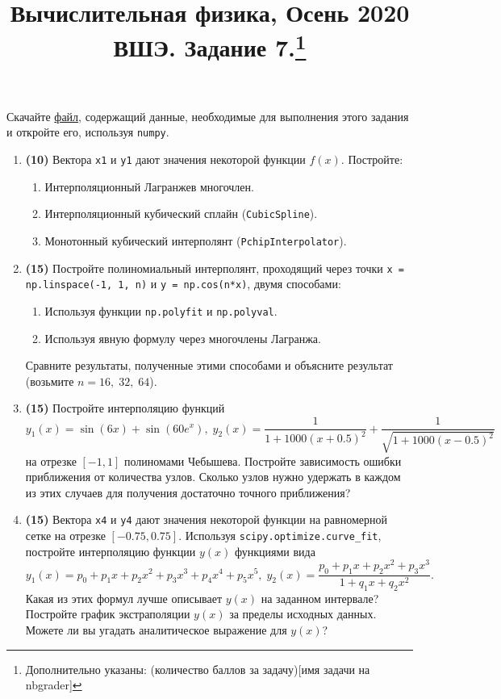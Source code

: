 \documentclass[prb,papersize=a4paper,notitlepage]{revtex4-1}%
\begin{document}
\title{Вычислительная физика, Осень 2020 ВШЭ. Задание 7.\footnote{Дополнительно указаны: (количество баллов за задачу)[имя задачи на nbgrader]}}
\maketitle
Скачайте \href{https://www.dropbox.com/s/txs1nmehh7aw71w/data.npz?dl=0}{файл}, содержащий данные, необходимые для выполнения этого задания и откройте его, используя \lstinline{numpy}.

\begin{enumerate}
\item \textbf{(10)} Вектора \lstinline{x1} и \lstinline{y1} дают значения некоторой функции $f(x)$. 
Постройте:
\begin{enumerate}
\item Интерполяционный Лагранжев многочлен.
\item Интерполяционный кубический сплайн (\lstinline{CubicSpline}).
\item Монотонный кубический интерполянт (\lstinline{PchipInterpolator}).
\end{enumerate}


\item \textbf{(15)}
Постройте полиномиальный интерполянт, проходящий через точки \lstinline{x = np.linspace(-1, 1, n)} и \lstinline{y = np.cos(n*x)}, двумя способами:
\begin{enumerate}
\item Используя функции \lstinline{np.polyfit} и \lstinline{np.polyval}.
\item Используя явную формулу через многочлены Лагранжа.
\end{enumerate}
Сравните результаты, полученные этими способами и объясните результат (возьмите $n=16,\;32,\;64$).


\item \textbf{(15)}
Постройте интерполяцию функций
$$
y_1(x)=\sin(6x) + \sin(60 e^x),\; y_2(x)=\frac{1}{1+1000(x+0.5)^2}+\frac{1}{\sqrt{1+1000(x-0.5)^2}}
$$
на отрезке $[-1,1]$ полиномами Чебышева. Постройте зависимость ошибки приближения от количества узлов. Сколько узлов нужно удержать в каждом из этих случаев для получения достаточно точного приближения? 

\item \textbf{(15)} Вектора \lstinline{x4} и \lstinline{y4} дают значения некоторой функции на равномерной сетке на отрезке $[-0.75, 0.75]$. Используя \lstinline{scipy.optimize.curve_fit}, постройте интерполяцию функции $y(x)$ функциями вида
$$
y_1(x)=p_0+p_1 x+p_2 x^2+p_3 x^3+p_4 x^4 + p_5 x^5,\; y_2(x)=\frac{p_0+p_1 x+p_2 x^2+p_3 x^3}{1+q_1 x+q_2 x^2}.
$$
Какая из этих формул лучше описывает $y(x)$ на заданном интервале? Постройте график экстраполяции $y(x)$ за пределы исходных данных. Можете ли вы угадать аналитическое выражение для $y(x)$?


\end{enumerate}
\end{document}
